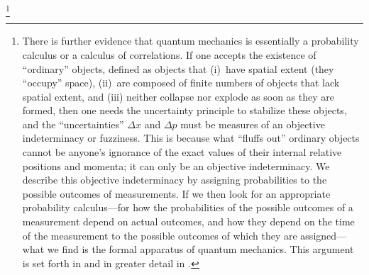 \footnote{\label{oo}There is further evidence that quantum mechanics is essentially a probability calculus or a calculus of correlations. If one accepts the existence of ``ordinary'' objects, defined as objects that (i)~have spatial extent (they ``occupy'' space), (ii)~are composed of finite numbers of objects that lack spatial extent, and (iii) neither collapse nor explode as soon as they are formed, then one needs the uncertainty principle to stabilize these objects, and the ``uncertainties'' $\Delta x$ and $\Delta p$ must be measures of an objective indeterminacy or fuzziness. This is because what ``fluffs out'' ordinary objects cannot be anyone's ignorance of the exact values of their internal relative positions and momenta; it can only be an objective indeterminacy. We describe this objective indeterminacy by assigning probabilities to the possible outcomes of measurements. If we then look for an appropriate probability calculus---for how the probabilities of the possible outcomes of a measurement depend on actual outcomes, and how they depend on the time of the measurement to the possible outcomes of which they are assigned---what we find is the formal apparatus of quantum mechanics. This argument is set forth in \citep{Mohrhoff2009b} and in greater detail in \citep[Chapter 8]{Mohrhoff2011}.}

